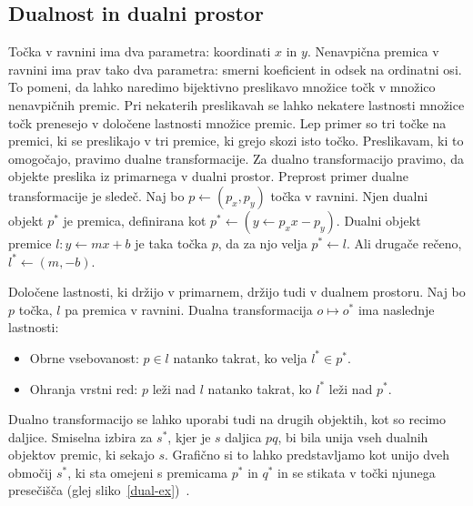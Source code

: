 \documentclass[a4paper, 12pt]{book}
\begin{document}
\subsection{Dualnost in dualni prostor}
\label{dual-chapter}
Točka v ravnini ima dva parametra: koordinati $x$ in $y$. Nenavpična premica v ravnini ima prav tako dva parametra: smerni koeficient in odsek na ordinatni osi. To pomeni, da lahko naredimo bijektivno preslikavo množice točk v množico nenavpičnih premic. Pri nekaterih preslikavah se lahko nekatere lastnosti množice točk prenesejo v določene lastnosti množice premic. Lep primer so tri točke na premici, ki se preslikajo v tri premice, ki grejo skozi isto točko. Preslikavam, ki to omogočajo, pravimo dualne transformacije. Za dualno transformacijo pravimo, da objekte preslika iz primarnega v dualni prostor. Preprost primer dualne transformacije je sledeč. Naj bo $p \gets (p_x, p_y)$ točka v ravnini. Njen dualni objekt $p^*$ je premica, definirana kot $p^* \gets (y \gets p_xx - p_y)$. Dualni objekt premice $l: y \gets mx + b$ je taka točka $p$, da za njo velja $p^* \gets l$. Ali drugače rečeno, $l^* \gets (m, -b)$.  

Določene lastnosti, ki držijo v primarnem, držijo tudi v  dualnem prostoru. Naj bo $p$ točka, $l$ pa premica v ravnini. Dualna transformacija $o \mapsto o^*$ ima naslednje lastnosti:
\begin{itemize}
\item Obrne vsebovanost: $p\in l$ natanko takrat, ko velja $l^*\in p^*$.
\item Ohranja vrstni red: $p$ leži nad $l$ natanko takrat, ko $l^*$ leži nad $p^*$.  
\end{itemize}

Dualno transformacijo se lahko uporabi tudi na drugih objektih, kot so recimo daljice. Smiselna izbira za $s^*$, kjer je $s$ daljica $pq$, bi bila unija vseh dualnih objektov premic, ki sekajo $s$. Grafično si to lahko predstavljamo kot unijo dveh območij $s^*$, ki sta omejeni s premicama $p^*$ in $q^*$ in se stikata v točki njunega presečišča (glej sliko~\ref{dual-ex})~\cite[poglavje 8.2]{bkos-08-all}.
\end{document}

